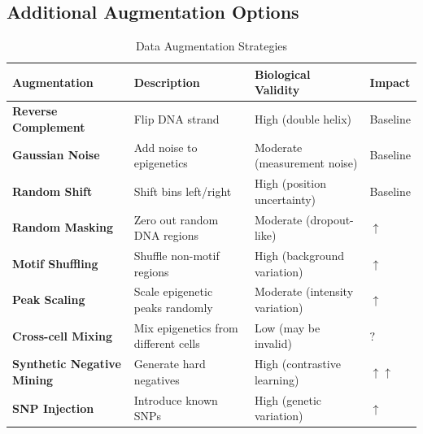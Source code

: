 \documentclass[11pt,a4paper]{article}
\begin{document}
\subsection{Additional Augmentation Options}

\begin{longtable}{L{3cm}L{4cm}L{4cm}C{1.5cm}}
\caption{Data Augmentation Strategies} \\
\toprule
\textbf{Augmentation} & \textbf{Description} & \textbf{Biological Validity} & \textbf{Impact} \\
\midrule
\endfirsthead
\bottomrule
\endlastfoot

\textbf{Reverse Complement} & Flip DNA strand & High (double helix) & Baseline \\

\textbf{Gaussian Noise} & Add noise to epigenetics & Moderate (measurement noise) & Baseline \\

\textbf{Random Shift} & Shift bins left/right & High (position uncertainty) & Baseline \\

\textbf{Random Masking} & Zero out random DNA regions & Moderate (dropout-like) & \textcolor{positive}{$\uparrow$} \\

\textbf{Motif Shuffling} & Shuffle non-motif regions & High (background variation) & \textcolor{positive}{$\uparrow$} \\

\textbf{Peak Scaling} & Scale epigenetic peaks randomly & Moderate (intensity variation) & \textcolor{positive}{$\uparrow$} \\

\textbf{Cross-cell Mixing} & Mix epigenetics from different cells & Low (may be invalid) & \textcolor{uncertain}{$?$} \\

\textbf{Synthetic Negative Mining} & Generate hard negatives & High (contrastive learning) & \textcolor{positive}{$\uparrow\uparrow$} \\

\textbf{SNP Injection} & Introduce known SNPs & High (genetic variation) & \textcolor{positive}{$\uparrow$} \\

\end{longtable}

\end{document}
